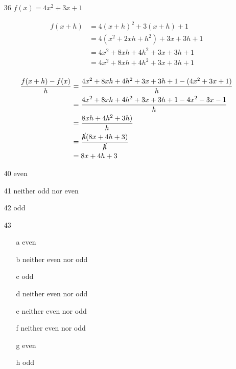 \documentclass[fleqn,addpoints]{exam}
\begin{document}
\begin{itemize}
\item[36]
  $f(x) = 4x^2 + 3x + 1$

\begin{align*}
  f(x+h) &= 4(x + h)^2 + 3(x+h) + 1 \\
         &= 4(x^2 + 2xh + h^2) + 3x + 3h + 1 \\
         &= 4x^2 + 8xh + 4h^2 + 3x + 3h + 1 \\
         &= 4x^2 + 8xh + 4h^2 + 3x + 3h + 1 \\
\end{align*}

\begin{align*}
  \frac{f(x+h) - f(x)}{h} &= \frac{4x^2 + 8xh + 4h^2 + 3x + 3h + 1 - (4x^2 + 3x + 1)}{h} \\
  &= \frac{4x^2 + 8xh + 4h^2 + 3x + 3h + 1 - 4x^2 - 3x - 1}{h} \\
  &= \frac{8xh + 4h^2 + 3h)}{h} \\
  &= \frac{\cancel{h} (8x + 4h + 3)}{\cancel{h}} \\
  &= 8x + 4h + 3 \\
\end{align*}

\item[40]
even

\item[41]
neither odd nor even

\item[42]
odd

\item[43]
\begin{itemize}
\item[a] even
\item[b] neither even nor odd
\item[c] odd
\item[d] neither even nor odd
\item[e] neither even nor odd
\item[f] neither even nor odd
\item[g] even
\item[h] odd
\end{itemize}


\end{itemize}
\end{document}
